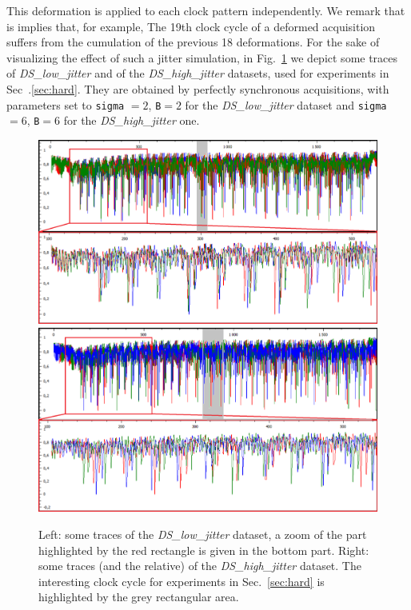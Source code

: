 This deformation is applied to each clock pattern independently. We remark that is implies that, for example, The 19th clock cycle of a deformed acquisition suffers from the cumulation of the previous 18 deformations. For the sake of visualizing the effect of such a jitter simulation, in Fig.~\ref{fig:jitter_traces} we depict some traces of  \emph{DS\_low\_jitter} and of the \emph{DS\_high\_jitter} datasets, used for experiments in Sec~.\ref{sec:hard}. They are obtained by perfectly synchronous acquisitions, with parameters set to \texttt{sigma} $= 2$, \texttt{B}$= 2$ for the \emph{DS\_low\_jitter}  dataset and \texttt{sigma} $= 6$, \texttt{B}$= 6$ for the \emph{DS\_high\_jitter} one.

\begin{figure}
\includegraphics[width=.5\textwidth]{../Figures/CHES2017/jitter_2_2_framed.png} 
\includegraphics[width=.5\textwidth]{../Figures/CHES2017/jitter_6_6_framed.png} 
\caption[]{Left: some traces of the \emph{DS\_low\_jitter} dataset, a zoom of the part highlighted by the red rectangle is given in the bottom part. Right: some traces (and the relative) of the \emph{DS\_high\_jitter} dataset. The interesting clock cycle for experiments in Sec.~\ref{sec:hard} is highlighted by the grey rectangular area.}\label{fig:jitter_traces}
\end{figure}


